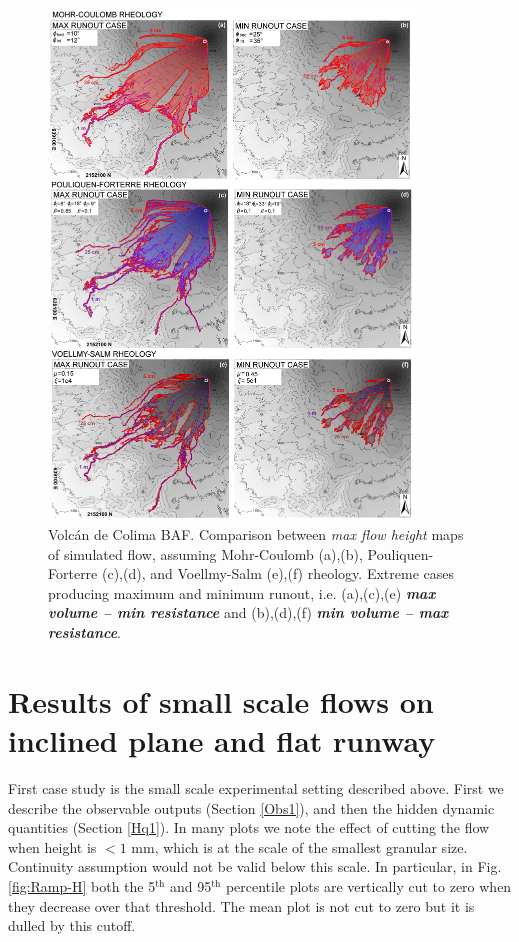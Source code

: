 \documentclass{article}
\begin{document}
\begin{figure}[H]
         \centering
        \includegraphics[width=0.87\textwidth]{Figures/ExtremeMaps.jpg}
        \caption{Volc\'an de Colima BAF. Comparison between \emph{max flow height} maps of simulated flow, assuming Mohr-Coulomb (a),(b), Pouliquen-Forterre (c),(d), and Voellmy-Salm (e),(f) rheology. Extreme cases producing maximum and minimum runout, i.e. (a),(c),(e) \emph{\textbf{max volume -- min resistance}} and (b),(d),(f) \emph{\textbf{min volume -- max resistance}}.}
        \label{Colima-MaxMinExtents}
\end{figure}

\section{Results of small scale flows on inclined plane and flat runway}\label{sec:QoIs}
First case study is the small scale experimental setting described above. First we describe the observable outputs (Section \ref{Obs1}), and then the hidden dynamic quantities (Section \ref{Hq1}). In many plots we note the effect of cutting the flow when height is $<1$ mm, which is at the scale of the smallest granular size. Continuity assumption would not be valid below this scale. In particular, in Fig. \ref{fig:Ramp-H} both the 5$^{\mathrm{th}}$ and 95$^{\mathrm{th}}$ percentile plots are vertically cut to zero when they decrease over that threshold. The mean plot is not cut to zero but it is dulled by this cutoff.
\end{document}
